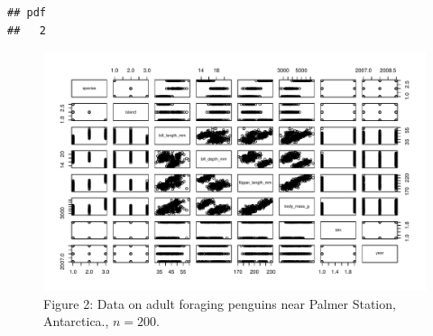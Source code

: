 \documentclass{article}\usepackage[]{graphicx}\usepackage[]{xcolor}
\makeatletter
\newenvironment{kframe}{%
 \def\at@end@of@kframe{}%
 \ifinner\ifhmode%
  \def\at@end@of@kframe{\end{minipage}}%
  \begin{minipage}{\columnwidth}%
 \fi\fi%
 \def\FrameCommand##1{\hskip\@totalleftmargin \hskip-\fboxsep
 \colorbox{shadecolor}{##1}\hskip-\fboxsep
     \hskip-\linewidth \hskip-\@totalleftmargin \hskip\columnwidth}%
 \MakeFramed {\advance\hsize-\width
   \@totalleftmargin\z@ \linewidth\hsize
   \@setminipage}}%
 {\par\unskip\endMakeFramed%
 \at@end@of@kframe}
\newenvironment{knitrout}{}{} %
\makeatother
\begin{document}
\begin{multicols}{2}
\begin{knitrout}
\begin{kframe}
\begin{verbatim}
## pdf 
##   2
\end{verbatim}
\end{kframe}
\end{knitrout}
\begin{figure}[H]
\begin{center}
\includegraphics[scale=0.8]{figure/penguins.pdf}
\caption{Figure 2: Data on adult foraging penguins near Palmer Station, Antarctica., $n=200$.}
\label{plot3}
\end{center}
\end{figure}

\begin{tiny}

\end{tiny}
\end{multicols}
\end{document}
